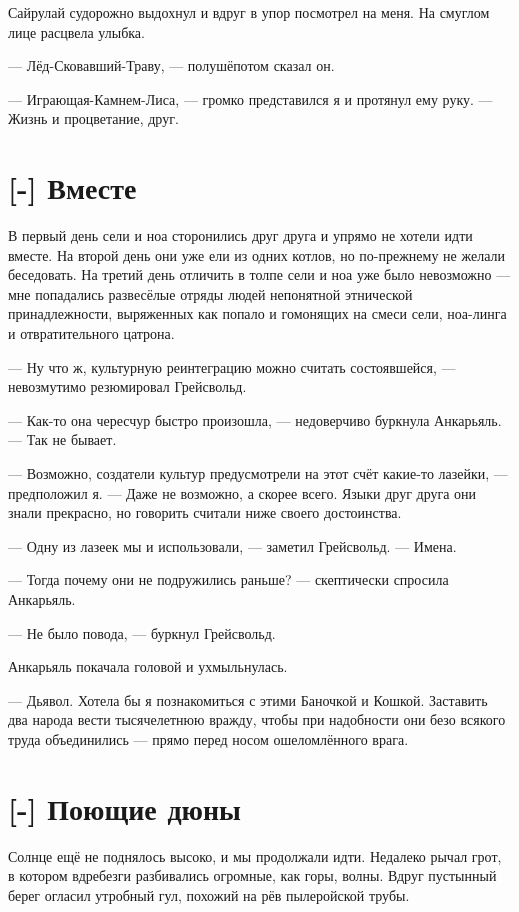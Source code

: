 Сайрулай судорожно выдохнул и вдруг в упор посмотрел на меня.
На смуглом лице расцвела улыбка.

--- Лёд-Сковавший-Траву, --- полушёпотом сказал он.

--- Играющая-Камнем-Лиса, --- громко представился я и протянул ему руку.
--- Жизнь и процветание, друг.

\section{[-] Вместе}

\textspace

В первый день сели и ноа сторонились друг друга и упрямо не хотели идти вместе.
На второй день они уже ели из одних котлов, но по-прежнему не желали беседовать.
На третий день отличить в толпе сели и ноа уже было невозможно --- мне попадались развесёлые отряды людей непонятной этнической принадлежности, выряженных как попало и гомонящих на смеси сели, ноа-линга и отвратительного цатрона.

---  Ну что ж, культурную реинтеграцию можно считать состоявшейся, --- невозмутимо резюмировал Грейсвольд.

---  Как-то она чересчур быстро произошла, --- недоверчиво буркнула Анкарьяль.
--- Так не бывает.

--- Возможно, создатели культур предусмотрели на этот счёт какие-то лазейки, --- предположил я.
--- Даже не возможно, а скорее всего.
Языки друг друга они знали прекрасно, но говорить считали ниже своего достоинства.

--- Одну из лазеек мы и использовали, --- заметил Грейсвольд.
--- Имена.

--- Тогда почему они не подружились раньше? --- скептически спросила Анкарьяль.

--- Не было повода, --- буркнул Грейсвольд.

Анкарьяль покачала головой и ухмыльнулась.

--- Дьявол.
Хотела бы я познакомиться с этими Баночкой и Кошкой.
Заставить два народа вести тысячелетнюю вражду, чтобы при надобности они безо всякого труда объединились --- прямо перед носом ошеломлённого врага.

\section{[-] Поющие дюны}

Солнце ещё не поднялось высоко, и мы продолжали идти.
Недалеко рычал грот, в котором вдребезги разбивались огромные, как горы, волны.
Вдруг пустынный берег огласил утробный гул, похожий на рёв пылеройской трубы.

